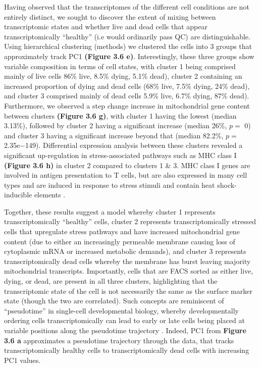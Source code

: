 Having observed that the transcriptomes of the different cell conditions are not entirely distinct, we sought to discover the extent of mixing between transcriptomic states and whether live and dead cells that appear transcriptomically ``healthy'' (i.e would ordinarily pass QC) are distinguishable. Using hierarchical clustering (methods) we clustered the cells into 3 groups  that approximately track PC1  \textbf{(Figure 3.6 e)}. Interestingly, these three groups show variable composition in terms of cell states, with cluster 1 being comprised mainly of live cells 86\% live, 8.5\% dying, 5.1\% dead), cluster 2 containing an increased proportion of dying and dead cells (68\% live, 7.5\% dying, 24\% dead), and cluster 3 comprised mainly of dead cells 5.9\% live, 6.7\% dying, 87\% dead).  Furthermore, we observed a step change increase in mitochondrial gene content between clusters \textbf{(Figure 3.6 g)}, with cluster 1 having the lowest (median 3.13\%), followed by cluster 2 having a significant increase (median  26\%, $p=$ 0) and cluster 3 having a significant increase beyond that (median 82.2\%, $p=$ 2.35e−149). Differential expression analysis between these clusters revealed a significant up-regulation in stress-associated pathways such as MHC class I  \textbf{(Figure 3.6 h)} in cluster 2 compared to clusters 1 \& 3. MHC class I genes are involved in antigen presentation to T cells, but are also expressed in many cell types and are induced in response to stress stimuli and contain heat shock-inducible elements \cite{gleimer2003stress}. 

Together, these results suggest a model whereby cluster 1 represents transcriptomically ``healthy'' cells, cluster 2 represents transcriptomically stressed cells that upregulate stress pathways  and have increased mitochondrial gene content (due to either an increasingly permeable membrane causing loss of cytoplasmic mRNA or increased metabolic demands), and cluster 3 represents transcriptomically dead cells whereby the membrane has burst leaving majority mitochondrial transcripts. Importantly, cells that are FACS sorted as either live, dying, or dead, are present in all three clusters, highlighting that the transcriptomic state of the cell is not necessarily the same as the surface marker state (though the two are correlated). Such concepts are reminiscent of ``pseudotime'' in single-cell developmental biology, whereby developmentally ordering cells transcriptomically can lead to early or late cells being placed at variable positions along the pseudotime trajectory \cite{campbell2018descriptive,campbell2018uncovering}. Indeed, PC1 from \textbf{Figure 3.6 a} approximates a pseudotime trajectory through the data, that tracks transcriptomically healthy cells to transcriptomically dead cells with increasing PC1 values.

